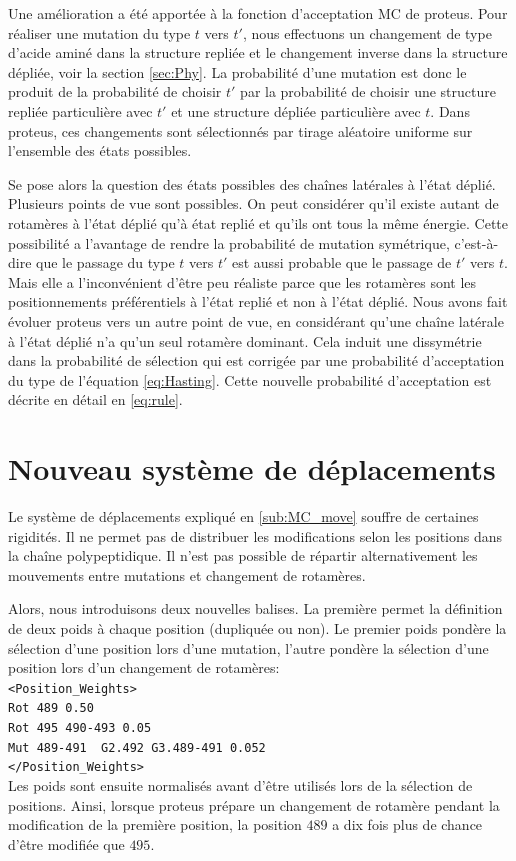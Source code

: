 Une amélioration a été apportée à la fonction d'acceptation MC de proteus. Pour réaliser une mutation du type $t$ vers $t'$, nous effectuons un changement de type d'acide aminé dans la structure repliée et le changement inverse dans la structure dépliée, voir la section \ref{sec:Phy}. La probabilité d'une mutation est donc le produit de la probabilité de choisir $t'$ par la probabilité de choisir une structure repliée particulière avec $t'$ et une structure dépliée particulière avec $t$. Dans proteus, ces changements sont sélectionnés par tirage aléatoire uniforme sur l'ensemble des états possibles. 

Se pose alors la question des états possibles des chaînes latérales à l'état déplié. Plusieurs points de vue sont possibles. On peut considérer qu'il existe autant de rotamères à l'état déplié qu'à état replié et qu'ils ont tous la même énergie. Cette possibilité a l'avantage de rendre la probabilité de mutation symétrique, c'est-à-dire que le passage du type $t$ vers $t'$ est aussi probable que le passage de $t'$ vers $t$. Mais elle a l'inconvénient d'être peu réaliste parce que les rotamères sont les positionnements préférentiels à l'état replié et non à l'état déplié. Nous avons fait évoluer proteus vers un autre point de vue, en considérant qu'une chaîne latérale à l'état déplié n'a qu'un seul rotamère dominant. Cela induit une dissymétrie dans la probabilité de sélection qui est corrigée par une probabilité d'acceptation du type de l'équation \ref{eq:Hasting}. Cette nouvelle probabilité d'acceptation est décrite en détail en \vref{eq:rule}.

\section{Nouveau système de déplacements}

Le système de déplacements expliqué en \ref{sub:MC_move}  souffre de certaines rigidités. Il ne permet pas de distribuer les modifications selon les positions dans la chaîne polypeptidique. Il n'est pas possible de répartir alternativement les mouvements entre mutations et changement de rotamères.

Alors, nous introduisons deux nouvelles balises. La première permet la définition de deux poids à chaque position (dupliquée ou non). Le premier poids pondère la sélection d'une position lors d'une mutation, l'autre pondère la sélection d'une position lors d'un changement de rotamères:\\
\verb!<Position_Weights>! \\
\verb!Rot 489 0.50 ! \\
\verb!Rot 495 490-493 0.05 ! \\
\verb!Mut 489-491  G2.492 G3.489-491 0.052 ! \\
\verb!</Position_Weights>! \\
Les poids sont ensuite normalisés avant d'être utilisés lors de la sélection de positions. Ainsi, lorsque proteus prépare un changement de rotamère pendant la modification de la première position, la position $489$ a dix fois plus de chance d'être modifiée que $495$.

